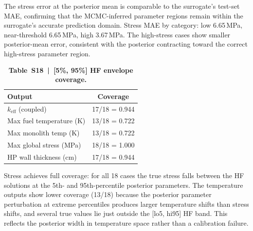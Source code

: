 \documentclass[11pt,a4paper]{article}
\newcommand{\keff}{\ensuremath{k_{\mathrm{eff}}}}
\begin{document}
The stress error at the posterior mean is comparable to the surrogate's
test-set MAE, confirming that the MCMC-inferred parameter regions remain
within the surrogate's accurate prediction domain. Stress MAE by
category: low 6.65\,MPa, near-threshold 6.65\,MPa, high 3.67\,MPa. The
high-stress cases show smaller posterior-mean error, consistent with the
posterior contracting toward the correct high-stress parameter region.

\begin{table}[htbp]
\centering
\caption{\textbf{Table~S18~|~[5\%, 95\%] HF envelope coverage.}}
\label{tab:S18}
\smallskip
\small
\begin{tabular}{lc}
\toprule
Output & Coverage \\
\midrule
\keff{} (coupled)           & 17/18 = 0.944 \\
Max fuel temperature (K)    & 13/18 = 0.722 \\
Max monolith temp (K)       & 13/18 = 0.722 \\
Max global stress (MPa)     & 18/18 = 1.000 \\
HP wall thickness (cm)      & 17/18 = 0.944 \\
\bottomrule
\end{tabular}
\end{table}

Stress achieves full coverage: for all 18 cases the true stress falls
between the HF solutions at the 5th- and 95th-percentile posterior
parameters. The temperature outputs show lower coverage (13/18) because
the posterior parameter perturbation at extreme percentiles produces
larger temperature shifts than stress shifts, and several true values lie
just outside the [lo5, hi95] HF band. This reflects the posterior width
in temperature space rather than a calibration failure.
\end{document}
